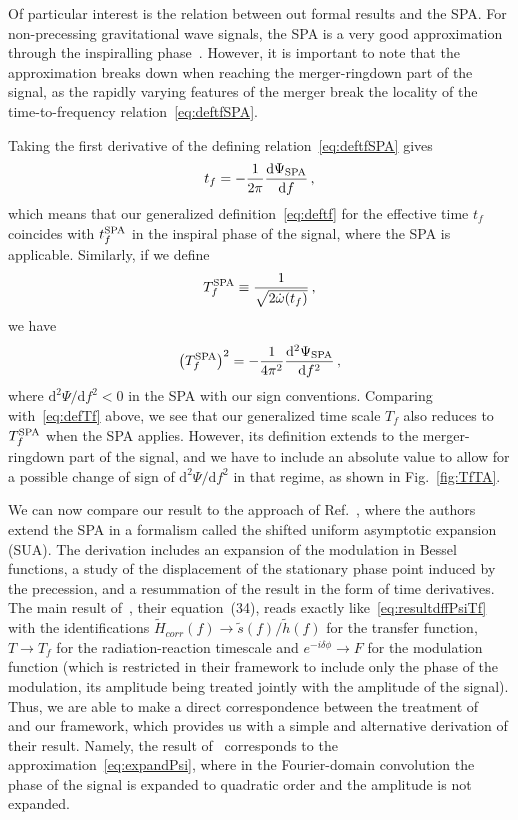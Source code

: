 \documentclass[aps,showpacs,%
prd,superscriptaddress,nofootinbib]{revtex4}
\newcommand{\be}{\begin{equation}}
\newcommand{\ee}{\end{equation}}
\newcommand\ud{{\mathrm{d}}}
\newcommand{\Tf}{T_{f}}
\begin{document}
Of particular interest is the relation between out formal results and the SPA. For non-precessing gravitational wave signals, the SPA is a very good approximation through the inspiralling phase~\cite{Droz+99}. However, it is important to note that the approximation breaks down when reaching the merger-ringdown part of the signal, as the rapidly varying features of the merger break the locality of the time-to-frequency relation~\eqref{eq:deftfSPA}.  

Taking the first derivative of the defining relation~\eqref{eq:deftfSPA} gives
\be
	t_{f} = -\frac{1}{2\pi} \frac{\ud \Psi_{\rm SPA}}{\ud f} \,,
\ee
which means that our generalized definition~\eqref{eq:deftf} for the effective time $t_{f}$ coincides with $t_{f}^{\rm SPA}$ in the inspiral phase of the signal, where the SPA is applicable. Similarly, if we define
\be
	T_{f}^{\rm SPA} \equiv \frac{1}{\sqrt{2\dot{\omega}(t_{f})}} \,,
\ee
we have
\be
	\left(T_{f}^{\rm SPA} \right)^{2} = -\frac{1}{4\pi^{2}}  \frac{\ud^{2} \Psi_{\rm SPA}}{\ud f^{2}} \,,
\ee
where $\ud^{2}\Psi/\ud f^{2} < 0$ in the SPA with our sign conventions. Comparing with~\eqref{eq:defTf} above, we see that our generalized time scale $\Tf$ also reduces to $T_{f}^{\rm SPA}$ when the SPA applies. However, its definition extends to the merger-ringdown part of the signal, and we have to include an absolute value to allow for a possible change of sign of $\ud^{2}\Psi/\ud f^{2}$ in that regime, as shown in Fig.~\ref{fig:TfTA}.

We can now compare our result to the approach of Ref.~\cite{Klein+14}, where the authors extend the SPA in a formalism called the shifted uniform asymptotic expansion (SUA). The derivation includes an expansion of the modulation in Bessel functions, a study of the displacement of the stationary phase point induced by the precession, and a resummation of the result in the form of time derivatives. The main result of~\cite{Klein+14}, their equation~(34), reads exactly like~\eqref{eq:resultdffPsiTf} with the identifications $\tilde{H}_{corr}(f)\rightarrow \tilde{s}(f)/\tilde{h}(f)$ for the transfer function, $T\rightarrow \Tf$ for the radiation-reaction timescale and $e^{-i\delta\phi} \rightarrow F$ for the modulation function (which is restricted in their framework to include only the phase of the modulation, its amplitude being treated jointly with the amplitude of the signal). Thus, we are able to make a direct correspondence between the treatment of~\cite{Klein+14} and our framework, which provides us with a simple and alternative derivation of their result. Namely, the result of~\cite{Klein+14} corresponds to the approximation~\eqref{eq:expandPsi}, where in the Fourier-domain convolution the phase of the signal is expanded to quadratic order and the amplitude is not expanded.
\end{document}
